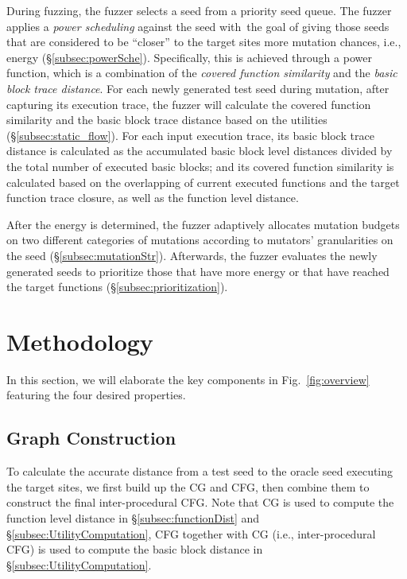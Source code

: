During fuzzing, the fuzzer selects a seed from a priority seed queue. The fuzzer applies a \textit{power scheduling} against the seed with~the goal of giving those seeds that are considered to be ``closer'' to the target sites more mutation chances, i.e., energy (\S\ref{subsec:powerSche}). Specifically, this is achieved through a power function, which is a combination of the \textit{covered function similarity} and the \textit{basic block trace distance}. For each newly generated test seed during mutation, after capturing its execution trace, the fuzzer will calculate the covered function similarity and the basic block trace distance based on the utilities (\S\ref{subsec:static_flow}). For each input execution trace, its basic block trace distance is calculated as the accumulated basic block level distances divided by the total number of executed basic blocks; and its covered function similarity is calculated based on the overlapping of current executed functions and the target function trace closure, as well as the function level distance.

After the energy is determined, the fuzzer adaptively allocates mutation budgets on two different categories of mutations according to mutators' granularities on the seed (\S\ref{subsec:mutationStr}).
Afterwards, the fuzzer evaluates the newly generated seeds to prioritize those that have more energy or that have reached the target functions (\S\ref{subsec:prioritization}).



\section{Methodology}

In this section, we will elaborate the key components in Fig.~\ref{fig:overview} featuring the four desired properties.


\subsection{Graph Construction} \label{subsec:graghCons}

To calculate the accurate distance from a test seed to the oracle seed executing the target sites, we first build up the CG and CFG, then combine them to construct the final inter-procedural CFG. Note that CG is used to compute the function level distance in \S\ref{subsec:functionDist} and \S\ref{subsec:UtilityComputation}, CFG together with CG (i.e., inter-procedural CFG) is used to compute the basic block distance in \S\ref{subsec:UtilityComputation}.




